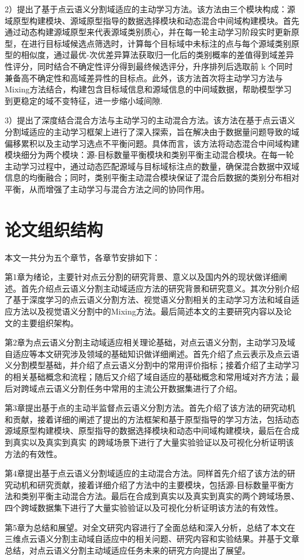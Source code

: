 2）提出了基于点云语义分割域适应的主动学习方法。该方法由三个模块构成：源域原型构建模块、源域原型指导的数据选择模块和动态混合中间域构建模块。首先通过动态构建源域原型来代表源域类别质心，并在每一轮主动学习阶段实时更新原型，在进行目标域候选点筛选时，计算每个目标域中未标注的点与每个源域类别原型的相似度，通过最优-次优差异算法获取归一化后的类别概率的差值得到域差异性评分，同时结合不确定性评分得到最终候选评分，升序排列后选取前 k 个同时兼备高不确定性和高域差异性的目标点。此外，该方法首次将主动学习方法与Mixing方法结合，构建包含目标域信息和源域信息的中间域数据，帮助模型学习到更稳定的域不变特征，进一步缩小域间隙.

3）提出了深度结合混合方法与主动学习的主动混合方法。该方法在基于点云语义分割域适应的主动学习框架上进行了深入探索，旨在解决由于数据量问题导致的域偏移累积以及主动学习选点不平衡问题。具体而言，该方法将动态混合中间域构建模块细分为两个模块：源-目标数量平衡模块和类别平衡主动混合模块。在每一轮主动学习过程中，通过动态匹配源域与目标域标注点的数量，确保混合数据中双域信息的均衡融合；同时，类别平衡主动混合模块保证了混合后数据的类别分布相对平衡，从而增强了主动学习与混合方法之间的协同作用。
\section{论文组织结构}
本文一共分为五个章节，各章节安排如下：

第1章为绪论，主要针对点云分割的研究背景、意义以及国内外的现状做详细阐述。首先介绍点云语义分割主动域适应方法的研究背景和研究意义。其次分别介绍了基于深度学习的点云语义分割方法、视觉语义分割相关的主动学习方法和域自适应方法以及视觉语义分割中的Mixing方法。最后简述本文的主要研究内容以及论文的主要组织架构。

第2章为点云语义分割主动域适应相关理论基础，对点云语义分割，主动学习及域自适应等本文研究涉及领域的基础知识做详细阐述。首先介绍了点云表示及点云语义分割模型基础，并介绍了点云语义分割中的常用评价指标；接着介绍了主动学习的相关基础概念和流程；随后又介绍了域自适应的基础概念和常用域对齐方法；最后对跨域点云语义分割任务中常用的主流公开数据集进行了介绍。

第3章提出基于点的主动半监督点云语义分割方法。首先介绍了该方法的研究动机和贡献，接着详细的阐述了提出的方法框架和基于原型指导的学习方法，包括动态源域原型构建模块、原型指导的数据选择模块和动态中间域构建模块，最后在合成到真实以及真实到真实
的跨域场景下进行了大量实验验证以及可视化分析证明该方法的有效性。

第4章提出基于点云语义分割域适应的主动混合方法。同样首先介绍了该方法的研究动机和研究贡献，接着详细介绍了方法中的主要模块，包括源-目标数量平衡方法和类别平衡主动混合方法。最后在合成到真实以及真实到真实的两个跨域场景、四个跨域数据集下进行了大量实验验证以及可视化分析证明该方法的有效性。

第5章为总结和展望。对全文研究内容进行了全面总结和深入分析，总结了本文在三维点云语义分割主动域自适应中的相关问题、研究内容和实验结果。并基于文章总结，对点云语义分割主动域适应任务未来的研究方向提出了展望。

\clearpage